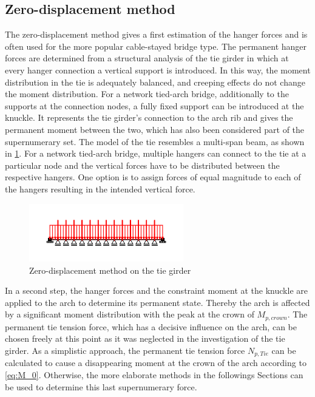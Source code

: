 \subsection{Zero-displacement method}
The zero-displacement method gives a first estimation of the hanger forces and is often used for the more popular cable-stayed bridge type. The permanent hanger forces are determined from a structural analysis of the tie girder in which at every hanger connection a vertical support is introduced. In this way, the moment distribution in the tie is adequately balanced, and creeping effects do not change the moment distribution. For a network tied-arch bridge, additionally to the supports at the connection nodes, a fully fixed support can be introduced at the knuckle. It represents the tie girder's connection to the arch rib and gives the permanent moment between the two, which has also been considered part of the supernumerary set. The model of the tie resembles a multi-span beam, as shown in \cref{fig:zero_disp}. For a network tied-arch bridge, multiple hangers can connect to the tie at a particular node and the vertical forces have to be distributed between the respective hangers. One option is to assign forces of equal magnitude to each of the hangers resulting in the intended vertical force. 

\begin{figure}[H]
    \centering
    \includegraphics[trim={0 1cm 0 1cm},clip,width=0.6\textwidth]{illustrations/optimisation methods/zero-displacement.png}
    \caption{Zero-displacement method on the tie girder}
    \label{fig:zero_disp}
\end{figure}

In a second step, the hanger forces and the constraint moment at the knuckle are applied to the arch to determine its permanent state. Thereby the arch is affected by a significant moment distribution with the peak at the crown of $M_{p,crown}$. The permanent tie tension force, which has a decisive influence on the arch, can be chosen freely at this point as it was neglected in the investigation of the tie girder. As a simplistic approach, the permanent tie tension force $N_{p,Tie}$ can be calculated to cause a disappearing moment at the crown of the arch according to \cref{eq:M_0}. Otherwise, the more elaborate methods in the followings Sections can be used to determine this last supernumerary force.

